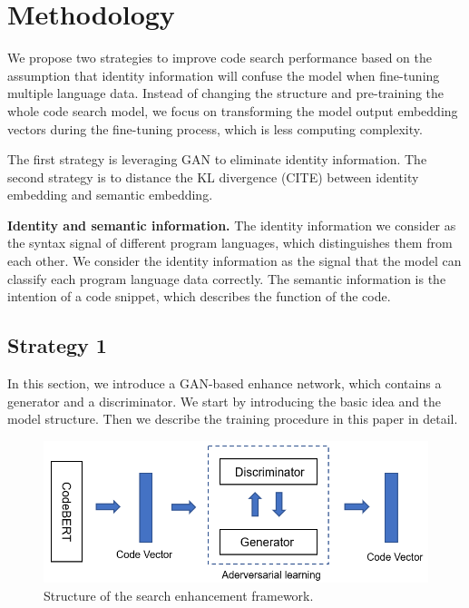 
\section{Methodology}

We propose two strategies to improve code search performance based on the assumption that identity information will confuse the model when fine-tuning multiple language data. Instead of changing the structure and pre-training the whole code search model, we focus on transforming the model output embedding vectors during the fine-tuning process, which is less computing complexity. 

The first strategy is leveraging GAN to eliminate identity information. The second strategy is to distance the KL divergence (CITE) between identity embedding and semantic embedding.

\noindent\textbf{Identity and semantic information.} The identity information we consider as the syntax signal of different program languages, which distinguishes them from each other. We consider the identity information as the signal that the model can classify each program language data correctly. The semantic information is the intention of a code snippet, which describes the function of the code.

\subsection{Strategy 1}

In this section, we introduce a GAN-based enhance network, 
which contains a generator and a discriminator. 
We start by introducing the basic idea and the model structure. 
Then we describe the training procedure in this paper in detail. 

\begin{figure}[htb]
	\centering
	\includegraphics[width=1\linewidth]{imgs/structure.png}
	\caption{Structure of the search enhancement framework.}
	\label{fig:structure}
\end{figure}

